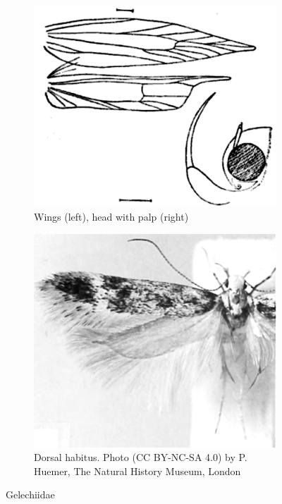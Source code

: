 \documentclass[letterpaper, 11pt]{article}
\begin{document}
\begin{figure}[ht!]
    \centering
    \begin{subfigure}[ht!]{0.4\textwidth}
        \includegraphics[width=\textwidth]{GelechiidWing}
        \caption{Wings (left), head with palp (right) \citep[][Fig. 27]{busck1903revision}}
        \label{fig:gelechiid1}
    \end{subfigure}
    \hfill %
    \begin{subfigure}[ht!]{0.4\textwidth}
        \includegraphics[width=\textwidth]{gelechiidHb.png}
        \caption{Dorsal habitus. Photo (CC BY-NC-SA 4.0) by P. Huemer, The Natural History Museum, London}
        \label{fig:gelechiid2}
    \end{subfigure}
    \caption{Gelechiidae}\label{fig:gelechiids}
\end{figure}
\end{document}
